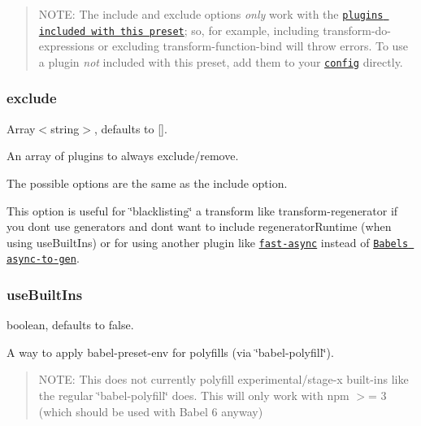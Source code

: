 \begin{quote}
N\+O\+TE\+: The {\ttfamily include} and {\ttfamily exclude} options {\itshape only} work with the \href{https://github.com/babel/babel-preset-env/blob/master/data/plugin-features.js}{\tt plugins included with this preset}; so, for example, including {\ttfamily transform-\/do-\/expressions} or excluding {\ttfamily transform-\/function-\/bind} will throw errors. To use a plugin {\itshape not} included with this preset, add them to your \href{https://babeljs.io/docs/usage/babelrc/}{\tt config} directly. \end{quote}


\subsubsection*{{\ttfamily exclude}}

{\ttfamily Array$<$string$>$}, defaults to {\ttfamily \mbox{[}\mbox{]}}.

An array of plugins to always exclude/remove.

The possible options are the same as the {\ttfamily include} option.

This option is useful for \char`\"{}blacklisting\char`\"{} a transform like {\ttfamily transform-\/regenerator} if you don\textquotesingle{}t use generators and don\textquotesingle{}t want to include {\ttfamily regenerator\+Runtime} (when using {\ttfamily use\+Built\+Ins}) or for using another plugin like \href{https://github.com/MatAtBread/fast-async}{\tt fast-\/async} instead of \href{http://babeljs.io/docs/plugins/transform-async-generator-functions/}{\tt Babel\textquotesingle{}s async-\/to-\/gen}.

\subsubsection*{{\ttfamily use\+Built\+Ins}}

{\ttfamily boolean}, defaults to {\ttfamily false}.

A way to apply {\ttfamily babel-\/preset-\/env} for polyfills (via \char`\"{}babel-\/polyfill\char`\"{}).

\begin{quote}
N\+O\+TE\+: This does not currently polyfill experimental/stage-\/x built-\/ins like the regular \char`\"{}babel-\/polyfill\char`\"{} does. This will only work with npm $>$= 3 (which should be used with Babel 6 anyway) \end{quote}



